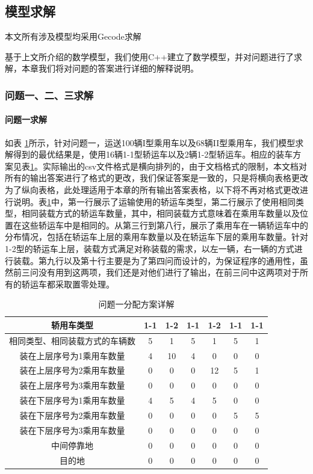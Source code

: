 \documentclass[UTF8]{ctexart}
\begin{document}
\subsection{模型求解}
本文所有涉及模型均采用Gecode\cite{gecode}求解

基于上文所介绍的数学模型，我们使用C++建立了数学模型，并对问题进行了求解，本章我们将对问题的答案进行详细的解释说明。

\subsubsection{问题一、二、三求解}
\paragraph{问题一求解}

如表 \ref{tab:answer1}所示，针对问题一，运送100辆I型乘用车以及68辆II型乘用车，我们模型求解得到的最优结果是，使用16辆1-1型轿运车以及2辆1-2型轿运车。相应的装车方案见表\ref{tab:answer1}。实际输出的csv文件格式是横向排列的，由于文档格式的限制，本文档对所有的输出答案进行了格式的更改，我们保证答案是一致的，只是将横向表格更改为了纵向表格，此处理适用于本章的所有输出答案表格，以下将不再对格式更改进行说明。表\ref{tab:answer1}中，第一行展示了运输使用的轿运车类型，第二行展示了使用相同类型，相同装载方式的轿运车数量，其中，相同装载方式意味着在乘用车数量以及位置在这些轿运车中是相同的。从第三行到第八行，展示了乘用车在一辆轿运车中的分布情况，包括在轿运车上层的乘用车数量以及在轿运车下层的乘用车数量。针对1-2型的轿运车上层，装载方式满足对称装载的需求，以左一辆，右一辆的方式进行装载。第九行以及第十行主要是为了第四问而设计的，为保证程序的通用性，虽然前三问没有用到这两项，我们还是对他们进行了输出，在前三问中这两项对于所有的轿运车都采取置零处理。

\begin{table}[h!]
\centering
\caption{问题一分配方案详解}\label{tab:answer1}
\begin{tabular}{|c|c|c|c|c|c|c|}
\hline
轿用车类型 & 1-1 & 1-2 & 1-1 & 1-2 & 1-1 & 1-1\\ \hline 
相同类型、相同装载方式的车辆数 & 5 & 1 & 5 & 1 & 5 & 1\\ \hline 
装在上层序号为1乘用车数量 & 4 & 10 & 4 & 0 & 0 & 0\\ \hline 
装在上层序号为2乘用车数量 & 0 & 0 & 0 & 12 & 5 & 1\\ \hline 
装在上层序号为3乘用车数量 & 0 & 0 & 0 & 0 & 0 & 0\\ \hline 
装在下层序号为1乘用车数量 & 4 & 5 & 4 & 5 & 0 & 0\\ \hline 
装在下层序号为2乘用车数量 & 0 & 0 & 0 & 0 & 5 & 5\\ \hline 
装在下层序号为3乘用车数量 & 0 & 0 & 0 & 0 & 0 & 0\\ \hline 
中间停靠地 & 0 & 0 & 0 & 0 & 0 & 0\\ \hline 
目的地 & 0 & 0 & 0 & 0 & 0 & 0\\ \hline
\end{tabular}
\end{table}
\end{document}
